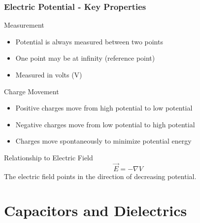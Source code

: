 \documentclass{beamer}
\begin{document}
\begin{frame}
    \frametitle{Electric Potential - Key Properties}
    \begin{block}{Measurement}
        \begin{itemize}
            \item Potential is always measured between two points
            \item One point may be at infinity (reference point)
            \item Measured in volts (V)
        \end{itemize}
    \end{block}
    
    \begin{block}{Charge Movement}
        \begin{itemize}
            \item Positive charges move from high potential to low potential
            \item Negative charges move from low potential to high potential
            \item Charges move spontaneously to minimize potential energy
        \end{itemize}
    \end{block}
    
    \begin{block}{Relationship to Electric Field}
        \begin{equation}
            \vec{E} = -\nabla V
        \end{equation}
        The electric field points in the direction of decreasing potential.
    \end{block}
\end{frame}

\section{Capacitors and Dielectrics}
\end{document}

